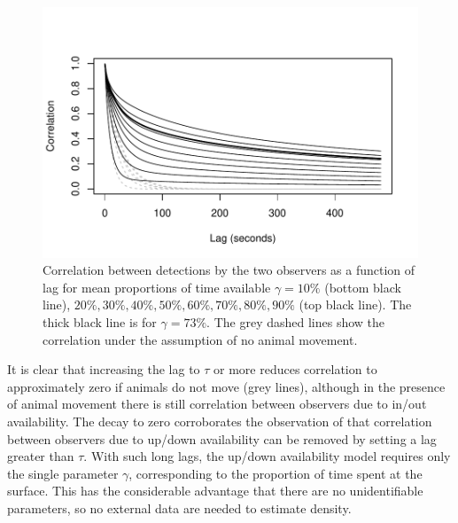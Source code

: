 \documentclass[useAMS, usenatbib, referee]{biom}\usepackage[]{graphicx}\usepackage[]{color}
\makeatletter
\def\maxwidth{ %
  \ifdim\Gin@nat@width>\linewidth
    \linewidth
  \else
    \Gin@nat@width
  \fi
}
\newenvironment{knitrout}{}{} %
\makeatother
\begin{document}
\begin{knitrout}
\color{fgcolor}\begin{figure}

{\centering \includegraphics[width=\maxwidth]{figs/fig_correlation_plot-1} 

}

\caption[Correlation between detections by the two observers as a function of lag for mean proportions of time available \(\gamma=10\%\) (bottom black line), \(20\%, 30\%, 40\%, 50\%, 60\%, 70\%, 80\%, 90\%\) (top black line)]{Correlation between detections by the two observers as a function of lag for mean proportions of time available \(\gamma=10\%\) (bottom black line), \(20\%, 30\%, 40\%, 50\%, 60\%, 70\%, 80\%, 90\%\) (top black line). The thick black line is for \(\gamma=73\%\). The grey dashed lines show the correlation under the assumption of no animal movement.}\label{fig:fig_correlation_plot}
\end{figure}


\end{knitrout}

It is clear that increasing the lag to $\tau$ or more reduces correlation to approximately zero if animals do not move (grey lines), although in the presence of animal movement there is still correlation between observers due to in/out availability. The decay to zero corroborates the observation of \cite{Stevenson+al:19} that correlation between observers due to up/down availability can be removed by setting a lag greater than $\tau$. With such long lags, the up/down availability model requires only the single parameter $\gamma$, corresponding to the proportion of time spent at the surface. This has the considerable advantage that there are no unidentifiable parameters, so no external data are needed to estimate density.
\end{document}
